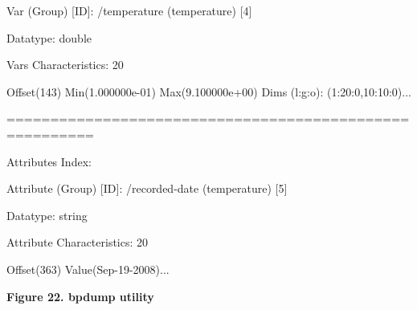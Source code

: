 \vspace{22pt}
\parindent=0pt
Var (Group) [ID]: /temperature (temperature) [4]

\vspace{10pt}
\parindent=28pt
Datatype: double

\vspace{10pt}
Vars Characteristics: 20

\vspace{10pt}
\parindent=86pt
Offset(143)             Min(1.000000e-01)               Max(9.100000e+00)      
         Dims (l:g:o): (1:20:0,10:10:0)...

\vspace{22pt}
\parindent=0pt
========================================================

\vspace{10pt}
Attributes Index:

\vspace{10pt}
Attribute (Group) [ID]: /recorded-date (temperature) [5]

\vspace{10pt}
\parindent=28pt
Datatype: string

\vspace{10pt}
Attribute Characteristics: 20

\vspace{10pt}
\parindent=0pt
Offset(363)             Value(Sep-19-2008)...

\label{HRef119579247}\label{HToc144350181}

\vspace{34pt}
\leftskip=18pt
{\color{color20} \textbf{Figure 22. bpdump utility\label{HToc84890281}\label{HToc212016657}\label{HToc212016899}\label{HToc182553430}}}
